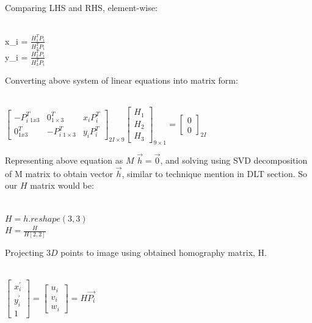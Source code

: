 \documentclass[a4paper]{article}
\begin{document}
Comparing LHS and RHS, element-wise: 

\begin{center}
\\{x_{i}} = \(\frac{H_{1}^T P_{i}}{H_{3}^T P_{i}}\)
\\{y_{i}} = \(\frac{H_{2}^T P_{i}}{H_{3}^T P_{i}}\)
\end{center}

Converting above system of linear equations into matrix form:  

\begin{center}
\\$ \begin{bmatrix} -P_{i}^T_{1x3} & 0^T_{1\times3} & x_{i}P_{i}^T \\ 0^T_{1x3} & -P_{i}^T_{1\times3} & y_{i}P_{i}^T  \end{bmatrix}_{2I\times9} \begin{bmatrix} H_{1}  \\ H_{2} \\ H_{3} \end{bmatrix}_{9\times1} = \begin{bmatrix} 0 \\ 0 \end{bmatrix}_{2I}$
\end{center}

Representing above equation as $M$ $\Vec{h} = \Vec{0}$, and solving using SVD decomposition of M matrix to obtain vector $\Vec{h}$, similar to technique mention in DLT section. So our $H$ matrix would be:  
\begin{center}
    \\$H = h.reshape(3, 3)$
    \\$H = \frac{H}{H[2, 2]}$
\end{center}

Projecting $3D$ points to image using obtained homography matrix, H.  

\begin{center}
\\$ \begin{bmatrix} x_{i}^'\\ y_{i}^'\\ 1 \end{bmatrix}   = \begin{bmatrix} u_{i}\\ v_{i}\\ w_{i} \end{bmatrix}  = H \Vec{P_{i}}$
\end{center}
\end{document}
